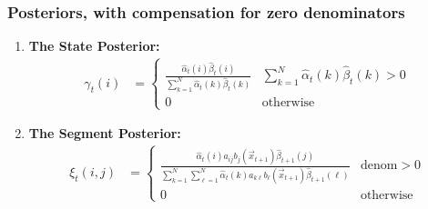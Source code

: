 \documentclass{beamer}
\begin{document}
\begin{frame}
  \frametitle{Posteriors, with compensation for zero denominators}

  \begin{enumerate}
  \item {\bf The State Posterior:}
    \begin{align*}
      \gamma_t(i) & 
      = \begin{cases}
        \frac{\hat\alpha_t(i)\hat\beta_t(i)}{\sum_{k=1}^N\hat\alpha_t(k)\hat\beta_t(k)}
        & \sum_{k=1}^N\hat\alpha_t(k)\hat\beta_t(k)>0\\
        0 & \mbox{otherwise}
      \end{cases}
    \end{align*}
  \item {\bf The Segment Posterior:}
    \begin{align*}
      \xi_t(i,j) & = 
      \begin{cases}
        \frac{\hat\alpha_t(i)a_{ij}b_j(\vec{x}_{t+1})\hat\beta_{t+1}(j)}{\sum_{k=1}^N\sum_{\ell=1}^N\hat\alpha_t(k)a_{k\ell}b_\ell(\vec{x}_{t+1})\hat\beta_{t+1}(\ell)}
        & \mbox{denom}>0\\
        0 & \mbox{otherwise}
      \end{cases}
    \end{align*}
  \end{enumerate}
\end{frame}
\end{document}
